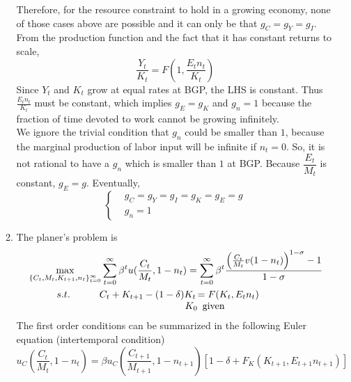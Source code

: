\documentclass{article}
\begin{document}
\begin{enumerate}
\begin{enumerate}
            Therefore, for the resource constraint to hold in a growing economy, none of those cases above are possible and it can only be that $g_C=g_Y=g_I$.\\
            From the production function and the fact that it has constant returns to scale,
            \begin{equation*}
                \frac{Y_t}{K_t}=F(1,\frac{E_tn_t}{K_t})
            \end{equation*}
            Since $Y_t$ and $K_t$ grow at equal rates at BGP, the LHS is constant. Thus $\frac{E_tn_t}{K_t}$ must be constant, which implies $g_E=g_K$ and $g_n=1$ because the fraction of time devoted to work cannot be growing infinitely.\\
            We ignore the trivial condition that $g_n$ could be smaller than $1$, because the marginal production of labor input will be infinite if $n_t=0$. So, it is not rational to have a $g_n$ which is smaller than $1$ at BGP. 
            Because $\dfrac{E_t}{M_t}$ is constant, $g_E=g$. Eventually,
            \begin{equation*}
                \begin{cases}
                    &g_C=g_Y=g_I=g_K=g_E=g\\
                    &g_n=1
                \end{cases}
            \end{equation*}
            \item The planer's problem is 
            \begin{align*}
                &\max_{\{C_t,M_t,K_{t+1},n_t\}_{t=0}^\infty}\sum_{t=0}^\infty\beta^tu(\frac{C_t}{M_t},1-n_t)=\sum_{t=0}^\infty\beta^t\frac{\left(\frac{C_t}{M_t}v(1-n_t)\right)^{1-\sigma}-1}{1-\sigma}\\
                & \begin{array}{@{\qquad\quad}r@{\qquad\quad}r@{}l}
                s.t.&C_t+K_{t+1}-(1-\delta)K_t\,&=F(K_t,E_tn_t)\\
                 &K_0&\enspace\text{given}
                \end{array}
            \end{align*}
            The first order conditions can be summarized in the following Euler equation (intertemporal condition)
            \begin{equation*}
                u_C(\frac{C_t}{M_t},1-n_t)=\beta u_C(\frac{C_{t+1}}{M_{t+1}},1-n_{t+1})[1-\delta+F_K(K_{t+1},E_{t+1}n_{t+1})]
            \end{equation*}

\end{enumerate}
\end{enumerate}
\end{document}
